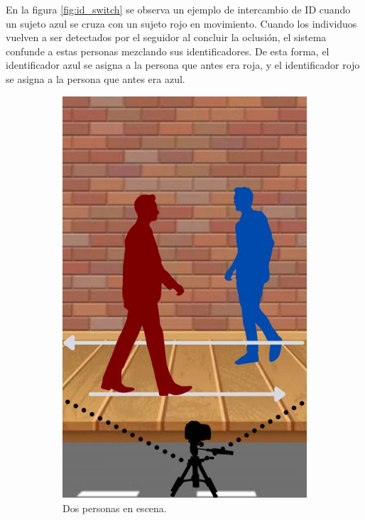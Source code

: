 En la figura \ref{fig:id_switch} se observa un ejemplo de intercambio de ID cuando un sujeto azul se cruza con un sujeto rojo en movimiento. Cuando los individuos vuelven a ser detectados por el seguidor al concluir la oclusión, el sistema confunde a estas personas mezclando sus identificadores. De esta forma, el identificador azul se asigna a la persona que antes era roja, y el identificador rojo se asigna a la persona que antes era azul.

\begin{figure}[!htpb]
     \centering
     \begin{subfigure}[b]{0.3\textwidth}
         \centering
         \includegraphics[width=.65\textwidth]{./Figures/id_switch1.jpg}
         \caption{Dos personas en escena.}
         \label{fig:id_switch1de3}
     \end{subfigure}
     \hfill
     \begin{subfigure}[b]{0.3\textwidth}
         \centering

\end{subfigure}
\end{figure}
